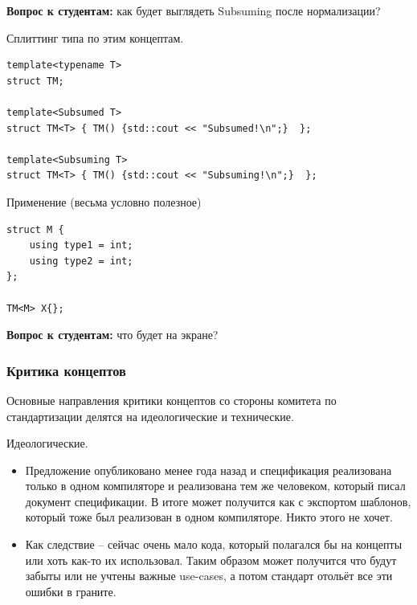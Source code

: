 \documentclass[a4paper,12pt,oneside]{article}
\newif\ifanswers
\begin{document}
\textbf{Вопрос к студентам:} как будет выглядеть Subsuming после нормализации?

\ifanswers
Ответ довольно очевиден:

\begin{lstlisting}
template<typename T>
concept bool Subsuming() {
    return requires () { typename T::type1; }
        && requires () { typename T::type2; };
}
\end{lstlisting}
\fi

Сплиттинг типа по этим концептам.

\begin{lstlisting}
template<typename T>
struct TM;

template<Subsumed T>
struct TM<T> { TM() {std::cout << "Subsumed!\n";}  };

template<Subsuming T>
struct TM<T> { TM() {std::cout << "Subsuming!\n";}  };
\end{lstlisting}

Применение (весьма условно полезное)

\begin{lstlisting}
struct M {
    using type1 = int;
    using type2 = int;
};

TM<M> X{};
\end{lstlisting}

\textbf{Вопрос к студентам:} что будет на экране?

\ifanswers
Разумеется на экране будет subsuming. Поглотивший констрейнт как более мощный имеет приоритет при разрешении перегрузки.
\fi

\subsubsection{Критика концептов}\label{WhyNotConstraints}

Основные направления критики концептов со стороны комитета по стандартизации делятся на идеологические и технические.

Идеологические.

\begin{itemize}
\item Предложение опубликовано менее года назад и спецификация реализована только в одном компиляторе и реализована тем же человеком, который писал документ спецификации. В итоге может получится как с экспортом шаблонов, который тоже был реализован в одном компиляторе. Никто этого не хочет.
\item Как следствие -- сейчас очень мало кода, который полагался бы на концепты или хоть как-то их использовал. Таким образом может получится что будут забыты или не учтены важные use-cases, а потом стандарт отольёт все эти ошибки в граните.
\end{itemize}
\end{document}
